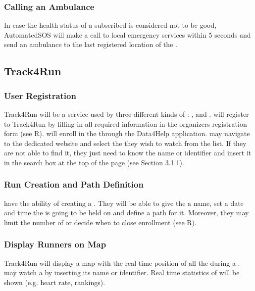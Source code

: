 \documentclass[../../rasd.tex]{subfiles}
\begin{document}
		\subsubsection{Calling an Ambulance}
		In case the health status of a subscribed  is considered not to be good, AutomatedSOS will make a call to local emergency services within 5 seconds and send an ambulance to the last registered location of the .

	\subsection{Track4Run}
		
		\subsubsection{User Registration}
		Track4Run will be a service used by three different kinds of : ,  and . will register to Track4Run by filling in all required information in the organizers registration form (see R).  will enroll in the  through the Data4Help application.  may navigate to the  dedicated website and select the  they wish to watch from the list. If they are not able to find it, they just need to know the  name or identifier and insert it in the search box at the top of the page (see Section 3.1.1).
		
		\subsubsection{Run Creation and Path Definition}
		 have the ability of creating a . They will be able to give the  a name, set a date and time the  is going to be held on and define a path for it. Moreover, they may limit the number of  or decide when to close enrollment (see R).
		
		\subsubsection{Display Runners on Map}
		Track4Run will display a map with the real time position of all the  during a .  may watch a  by inserting its name or identifier. Real time statistics of  will be shown (e.g. heart rate, rankings). 
\end{document}
